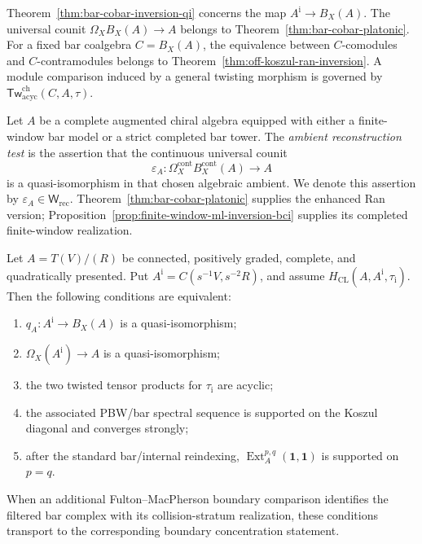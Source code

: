 \begin{remark}
Theorem~\ref{thm:bar-cobar-inversion-qi} concerns the map
\(A^{\mathrm i}\to B_X(A)\).  The universal counit
\(\Omega_XB_X(A)\to A\) belongs to
Theorem~\ref{thm:bar-cobar-platonic}.  For a fixed bar coalgebra
\(C=B_X(A)\), the equivalence between \(C\)-comodules and
\(C\)-contramodules belongs to
Theorem~\ref{thm:off-koszul-ran-inversion}.  A module comparison
induced by a general twisting morphism is governed by
\(\mathsf{Tw}^{\mathrm{ch}}_{\mathrm{acyc}}(C,A,\tau)\).
\end{remark}

\begin{definition}
\label{def:counit-detected-weak-equivalence-bci}
Let \(A\) be a complete augmented chiral algebra equipped with either
a finite-window bar model or a strict completed bar tower.  The
\emph{ambient reconstruction test} is the assertion that the
continuous universal counit
\[
\varepsilon_A\colon
\Omega_X^{\mathrm{cont}}B_X^{\mathrm{cont}}(A)\longrightarrow A
\]
is a quasi-isomorphism in that chosen algebraic ambient.  We denote
this assertion by \(\varepsilon_A\in\mathsf W_{\mathrm{rec}}\).
Theorem~\ref{thm:bar-cobar-platonic} supplies the enhanced Ran
version; Proposition~\ref{prop:finite-window-ml-inversion-bci}
supplies its completed finite-window realization.
\end{definition}

\begin{proposition}
\label{prop:koszul-locus-criteria-package-bci}
Let \(A=T(V)/(R)\) be connected, positively graded, complete, and
quadratically presented.  Put
\(A^{\mathrm i}=C(s^{-1}V,s^{-2}R)\), and assume
\(H_{\mathrm{CL}}(A,A^{\mathrm i},\tau_{\mathrm i})\).
Then the following conditions are equivalent:
\begin{enumerate}[label=\textup{(\roman*)}]
\item \(q_A\colon A^{\mathrm i}\to B_X(A)\) is a
quasi-isomorphism;
\item \(\Omega_X(A^{\mathrm i})\to A\) is a quasi-isomorphism;
\item the two twisted tensor products for
\(\tau_{\mathrm i}\) are acyclic;
\item the associated PBW/bar spectral sequence is supported on the
Koszul diagonal and converges strongly;
\item after the standard bar/internal reindexing,
\(\operatorname{Ext}^{p,q}_A(\mathbf1,\mathbf1)\) is supported on
\(p=q\).
\end{enumerate}
When an additional Fulton--MacPherson boundary comparison identifies
the filtered bar complex with its collision-stratum realization,
these conditions transport to the corresponding boundary
concentration statement.
\end{proposition}

